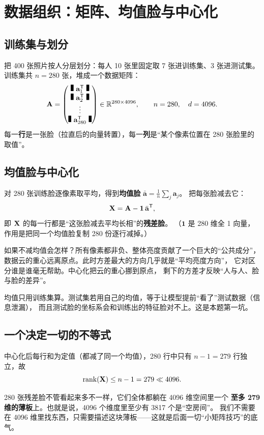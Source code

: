 \section{数据组织：矩阵、均值脸与中心化}

\subsection{训练集与划分}

把 400 张照片按人分层划分：每人 10 张里固定取 7 张进训练集、3 张进测试集。
训练集共 $n=280$ 张，堆成一个数据矩阵：
\[
\mat{A}=\begin{pmatrix}
\rule{4pt}{9pt}\ \mathbf{a}_1^{\mathsf{T}}\ \rule{4pt}{9pt}\\
\rule{4pt}{9pt}\ \mathbf{a}_2^{\mathsf{T}}\ \rule{4pt}{9pt}\\
\vdots\\
\rule{4pt}{9pt}\ \mathbf{a}_{280}^{\mathsf{T}}\ \rule{4pt}{9pt}
\end{pmatrix}\in\R^{280\times 4096},
\qquad n=280,\quad d=4096 .
\]
每一\textbf{行}是一张脸（拉直后的向量转置），每一\textbf{列}是“某个像素位置在 280 张脸里的取值”。

\subsection{均值脸与中心化}

对 280 张训练脸逐像素取平均，得到\textbf{均值脸} $\bar{\mathbf{a}}=\frac1n\sum_{j}\mathbf{a}_j$。
把每张脸减去它：
\[
\mathbf{X}=\mathbf{A}-\mathbf{1}\,\bar{\mathbf{a}}^{\mathsf{T}} ,
\]
即 $\mathbf{X}$ 的每一行都是“这张脸减去平均长相”的\textbf{残差脸}。
（$\mathbf{1}$ 是 280 维全 1 向量，作用是把同一个均值脸复制 280 份逐行减掉。）

\begin{why}
如果不减均值会怎样？所有像素都非负、整体亮度贡献了一个巨大的“公共成分”，
数据云的重心远离原点。此时方差最大的方向几乎就是“平均亮度方向”，
它对区分谁是谁毫无帮助。中心化把云的重心挪到原点，
剩下的方差才反映“人与人、脸与脸的差异”。
\end{why}

\begin{why}
均值只用训练集算。测试集若用自己的均值，等于让模型提前“看了”测试数据（信息泄漏），
而且测试脸的坐标系会和训练出的特征脸对不上。这是本题第一坑。
\end{why}

\subsection{一个决定一切的不等式}

中心化后每行和为定值（都减了同一个均值），280 行中只有 $n-1=279$ 行独立，故
\[
\operatorname{rank}(\mathbf{X})\le n-1=279\ll 4096 .
\]
\begin{intuition}
280 张残差脸不管看起来多不一样，它们全体都躺在 4096 维空间里一个
\textbf{至多 279 维的薄板}上。也就是说，4096 个维度里至少有 3817 个是“空房间”。
我们不需要在 4096 维里找东西，只需要描述这块薄板——这就是后面一切“小矩阵技巧”的底气。
\end{intuition}
